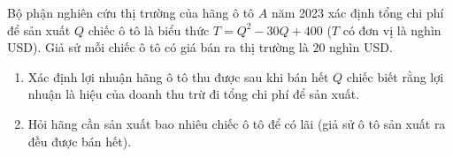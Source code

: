 \begin{bt}%
Bộ phận nghiên cứu thị trường của hãng ô tô $A$ năm 2023 xác định tổng chi phí để sản xuất $Q$ chiếc ô tô là biểu thức $T=Q^2-30 Q+400$ ($T$ có đơn vị là nghìn USD). Giả sử mỗi chiếc ô tô có giá bán ra thị trường là $20$ nghìn USD.
\begin{enumerate}
\item Xác định lợi nhuận hãng ô tô thu được sau khi bán hết $Q$ chiếc biết rằng lợi nhuận là hiệu của doanh thu trừ đi tổng chi phí để sản xuất.
\item Hỏi hãng cần sản xuất bao nhiêu chiếc ô tô để có lãi (giả sử ô tô sản xuất ra đều được bán hết).
\end{enumerate}
\end{bt}
